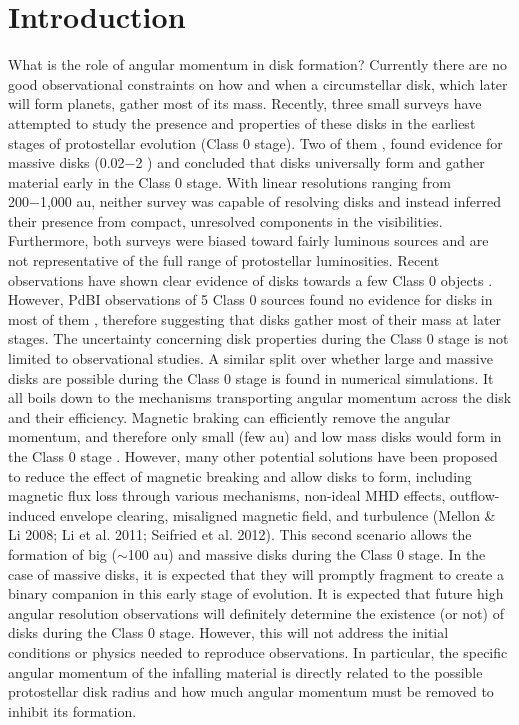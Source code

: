 \section{Introduction}

What is the role of angular momentum in disk formation?
Currently there are no good observational constraints on how and when a circumstellar disk, which later will form planets, gather most of its mass. 
Recently, three small surveys have attempted to study the presence and properties of these disks in the earliest stages of protostellar evolution (Class 0 stage). 
Two of them \citep{J_rgensen_2009,Enoch_2011}, found evidence for massive disks (0.02−2 \msun) and concluded that disks universally form and gather material early in the Class 0 stage. With linear resolutions ranging from 200−1,000 au, neither survey was capable of resolving disks and instead inferred their presence from compact, unresolved components in the visibilities. 
Furthermore, both surveys were biased toward fairly luminous sources and are not representative of the full range of protostellar luminosities. 
Recent observations have shown clear evidence of disks towards a few Class 0 objects \citep{Murillo_2013,Ohashi_2014}. 
However, PdBI observations of 5 Class 0 sources found no evidence for disks in most of them \citep{Maury_2010}, 
therefore suggesting that disks gather most of their mass at later stages.
The uncertainty concerning disk properties during the Class 0 stage is not limited to observational studies. 
A similar split over whether large and massive disks are possible during the Class 0 stage is found in numerical simulations. 
It all boils down to the mechanisms transporting angular momentum across the disk and their efficiency. 
Magnetic braking can efficiently remove the angular momentum, and therefore only small (few au) and low mass disks would form in the Class 0 stage \citep{Allen_2003,Hennebelle_2008,Mellon_2008,Seifried_2011}. 
However, many other potential solutions have been proposed to reduce the effect of magnetic breaking and allow disks to form, including magnetic flux loss through various mechanisms, non-ideal MHD effects, outflow-induced envelope clearing, misaligned magnetic field, and turbulence (Mellon & Li 2008; Li et al. 2011; Seifried et al. 2012). 
This second scenario allows the formation of big ($\sim$100 au) and massive disks during the Class 0 stage. 
In the case of massive disks, it is expected that they will promptly fragment to create a binary companion in this early stage of evolution.
It is expected that future high angular resolution observations will definitely determine the existence (or not) of disks during the Class 0 stage. 
However, this will not address the initial conditions or physics needed to reproduce observations. 
In particular, the specific angular momentum of the infalling material is directly related to the possible protostellar disk radius  and how much angular momentum must be removed to inhibit its formation.

